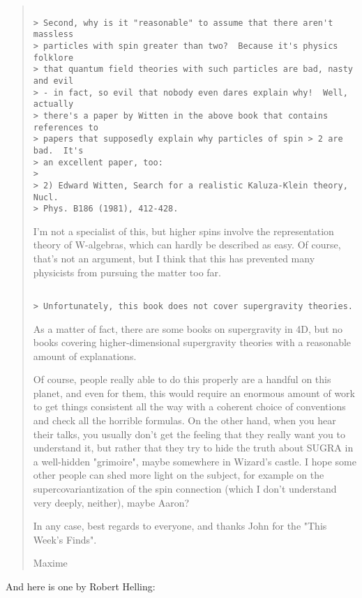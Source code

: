\begin{quote}
\begin{verbatim}

> Second, why is it "reasonable" to assume that there aren't massless
> particles with spin greater than two?  Because it's physics folklore
> that quantum field theories with such particles are bad, nasty and evil
> - in fact, so evil that nobody even dares explain why!  Well, actually
> there's a paper by Witten in the above book that contains references to
> papers that supposedly explain why particles of spin > 2 are bad.  It's
> an excellent paper, too:
>
> 2) Edward Witten, Search for a realistic Kaluza-Klein theory, Nucl.
> Phys. B186 (1981), 412-428.
\end{verbatim}
    

I'm not a specialist of this, but higher spins involve the representation
theory of W-algebras, which can hardly be described as easy. Of course, 
that's not an argument, but I think that this has prevented many physicists 
from pursuing the matter too far.


\begin{verbatim}

> Unfortunately, this book does not cover supergravity theories.
\end{verbatim}
    

As a matter of fact, there are some books on supergravity in 4D, but no books
covering higher-dimensional supergravity theories with a reasonable amount of
explanations.

Of course, people really able to do this properly are a handful on this
planet, and even for them, this would require an enormous amount of work to
get things consistent all the way with a coherent choice of conventions and
check all the horrible formulas. On the other hand, when you hear their talks,
you usually don't get the feeling that they really want you to understand it,
but rather that they try to hide the truth about SUGRA in a well-hidden
"grimoire", maybe somewhere in Wizard's castle.
I hope some other people can shed more light on the subject, for example on
the supercovariantization of the spin connection (which I don't understand
very deeply, neither), maybe Aaron?

In any case, best regards to everyone,
and thanks John for the "This Week's Finds".

Maxime
\end{quote}

And here is one by Robert Helling:

